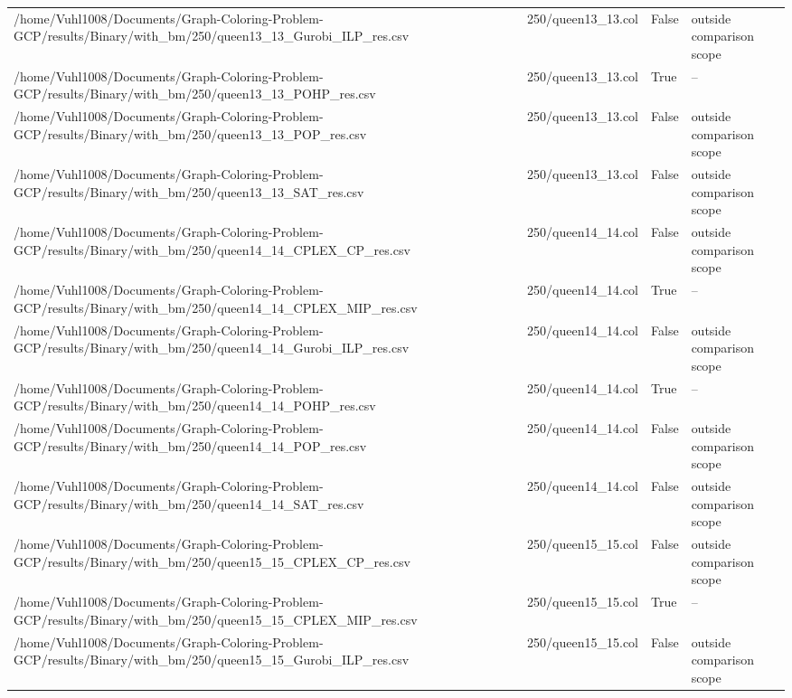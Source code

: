 \begin{table}[htbp]
\begin{tabular}{llll}
/home/Vuhl1008/Documents/Graph-Coloring-Problem-GCP/results/Binary/with\_bm/250/queen13\_13\_Gurobi\_ILP\_res.csv & 250/queen13\_13.col & False & outside comparison scope \\
/home/Vuhl1008/Documents/Graph-Coloring-Problem-GCP/results/Binary/with\_bm/250/queen13\_13\_POHP\_res.csv & 250/queen13\_13.col & True & -- \\
/home/Vuhl1008/Documents/Graph-Coloring-Problem-GCP/results/Binary/with\_bm/250/queen13\_13\_POP\_res.csv & 250/queen13\_13.col & False & outside comparison scope \\
/home/Vuhl1008/Documents/Graph-Coloring-Problem-GCP/results/Binary/with\_bm/250/queen13\_13\_SAT\_res.csv & 250/queen13\_13.col & False & outside comparison scope \\
/home/Vuhl1008/Documents/Graph-Coloring-Problem-GCP/results/Binary/with\_bm/250/queen14\_14\_CPLEX\_CP\_res.csv & 250/queen14\_14.col & False & outside comparison scope \\
/home/Vuhl1008/Documents/Graph-Coloring-Problem-GCP/results/Binary/with\_bm/250/queen14\_14\_CPLEX\_MIP\_res.csv & 250/queen14\_14.col & True & -- \\
/home/Vuhl1008/Documents/Graph-Coloring-Problem-GCP/results/Binary/with\_bm/250/queen14\_14\_Gurobi\_ILP\_res.csv & 250/queen14\_14.col & False & outside comparison scope \\
/home/Vuhl1008/Documents/Graph-Coloring-Problem-GCP/results/Binary/with\_bm/250/queen14\_14\_POHP\_res.csv & 250/queen14\_14.col & True & -- \\
/home/Vuhl1008/Documents/Graph-Coloring-Problem-GCP/results/Binary/with\_bm/250/queen14\_14\_POP\_res.csv & 250/queen14\_14.col & False & outside comparison scope \\
/home/Vuhl1008/Documents/Graph-Coloring-Problem-GCP/results/Binary/with\_bm/250/queen14\_14\_SAT\_res.csv & 250/queen14\_14.col & False & outside comparison scope \\
/home/Vuhl1008/Documents/Graph-Coloring-Problem-GCP/results/Binary/with\_bm/250/queen15\_15\_CPLEX\_CP\_res.csv & 250/queen15\_15.col & False & outside comparison scope \\
/home/Vuhl1008/Documents/Graph-Coloring-Problem-GCP/results/Binary/with\_bm/250/queen15\_15\_CPLEX\_MIP\_res.csv & 250/queen15\_15.col & True & -- \\
/home/Vuhl1008/Documents/Graph-Coloring-Problem-GCP/results/Binary/with\_bm/250/queen15\_15\_Gurobi\_ILP\_res.csv & 250/queen15\_15.col & False & outside comparison scope \\

\end{tabular}
\end{table}
